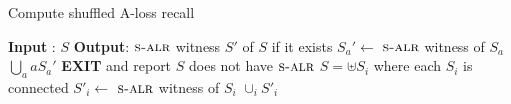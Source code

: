 
\begin{algorithm}{}  
\caption{Compute shuffled A-loss recall}
\label{algo:alosshuffle}
\begin{algorithmic}[1]
  \STATE \textbf{Input} : $S$
  \STATE \textbf{Output}: $\textsc{s-alr}$ witness $S'$ of $S$ if it exists
\STATE $S_a' \gets $ $\textsc{s-alr}$ witness of $S_a$%
\ENDFOR
\RETURN $\bigcup_{a} aS_a'$ 
\ELSE \STATE \textbf{EXIT} and report $S$ does not have $\textsc{s-alr}$ \label{algoShuffleLine:noshuffle}
\ENDIF
\ELSE
\STATE $S = \uplus S_i$ where each $S_i$ is connected 
\STATE $S'_i \gets $ $\textsc{s-alr}$ witness of $S_i$ \label{algoShuffleLine:disconnected}
\RETURN $\cup_i S'_i$
\ENDIF
\end{algorithmic} 
\end{algorithm}

